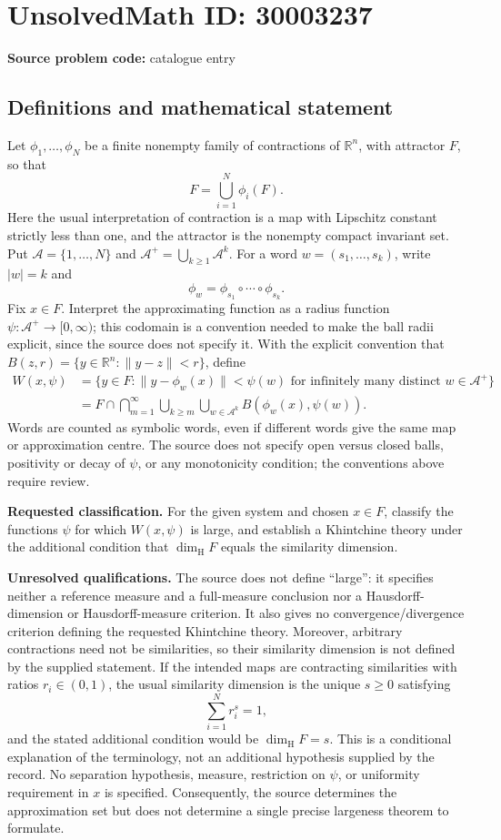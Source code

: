 \documentclass[11pt]{article}
\newcommand{\R}{\mathbb{R}}
\begin{document}
\section*{UnsolvedMath ID: 30003237}
\textbf{Source problem code:} catalogue entry
\subsection{Definitions and mathematical statement}
Let \(\phi_1,\ldots,\phi_N\) be a finite nonempty family of contractions of \(\R^n\), with attractor \(F\), so that
\[
F=\bigcup_{i=1}^{N}\phi_i(F).
\]
Here the usual interpretation of contraction is a map with Lipschitz constant strictly less than one, and the attractor is the nonempty compact invariant set. Put \(\mathcal A=\{1,\ldots,N\}\) and \(\mathcal A^+=\bigcup_{k\geq1}\mathcal A^k\). For a word \(w=(s_1,\ldots,s_k)\), write \(|w|=k\) and
\[
\phi_w=\phi_{s_1}\circ\cdots\circ\phi_{s_k}.
\]
Fix \(x\in F\). Interpret the approximating function as a radius function \(\psi:\mathcal A^+\to[0,\infty)\); this codomain is a convention needed to make the ball radii explicit, since the source does not specify it. With the explicit convention that \(B(z,r)=\{y\in\R^n:\|y-z\|<r\}\), define
\[
\begin{aligned}
W(x,\psi)
&=\{y\in F:\|y-\phi_w(x)\|<\psi(w)
\text{ for infinitely many distinct }w\in\mathcal A^+\}\\
&=F\cap\bigcap_{m=1}^{\infty}\bigcup_{k\geq m}\bigcup_{w\in\mathcal A^k}B(\phi_w(x),\psi(w)).
\end{aligned}
\]
Words are counted as symbolic words, even if different words give the same map or approximation centre. The source does not specify open versus closed balls, positivity or decay of \(\psi\), or any monotonicity condition; the conventions above require review.

\textbf{Requested classification.} For the given system and chosen \(x\in F\), classify the functions \(\psi\) for which \(W(x,\psi)\) is large, and establish a Khintchine theory under the additional condition that \(\dim_{\mathrm H}F\) equals the similarity dimension.

\textbf{Unresolved qualifications.} The source does not define ``large'': it specifies neither a reference measure and a full-measure conclusion nor a Hausdorff-dimension or Hausdorff-measure criterion. It also gives no convergence/divergence criterion defining the requested Khintchine theory. Moreover, arbitrary contractions need not be similarities, so their similarity dimension is not defined by the supplied statement. If the intended maps are contracting similarities with ratios \(r_i\in(0,1)\), the usual similarity dimension is the unique \(s\geq0\) satisfying
\[
\sum_{i=1}^{N}r_i^s=1,
\]
and the stated additional condition would be \(\dim_{\mathrm H}F=s\). This is a conditional explanation of the terminology, not an additional hypothesis supplied by the record. No separation hypothesis, measure, restriction on \(\psi\), or uniformity requirement in \(x\) is specified. Consequently, the source determines the approximation set but does not determine a single precise largeness theorem to formulate.
\end{document}
